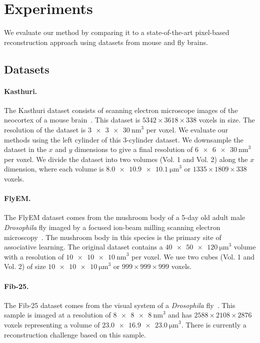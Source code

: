 \section{Experiments}

We evaluate our method by comparing it to a state-of-the-art pixel-based reconstruction approach using datasets from mouse and fly brains.

\subsection{Datasets}
\label{sec:dataset}

\paragraph{Kasthuri.}
The Kasthuri dataset consists of scanning electron microscope images of the neocortex of a mouse brain~\cite{kasthuri2015saturated}. 
This dataset is $5342 \times 3618 \times 338$ voxels in size. 
The resolution of the dataset is $\SI[product-units=single]{3 x 3 x 30}{\nano\meter}^3$ per voxel. 
We evaluate our methods using the left cylinder of this 3-cylinder dataset. 
We downsample the dataset in the $x$ and $y$ dimensions to give a final resolution of $\SI[product-units=single]{6 x 6 x 30}{\nano\meter}^3$ per voxel. 
We divide the dataset into two volumes (Vol. 1 and Vol. 2) along the $x$ dimension, where each volume is $\SI[product-units=single]{8.0 x 10.9 x 10.1}{\micro\meter}^3$ or $1335 \times 1809 \times 338$ voxels.

\paragraph{FlyEM.}
The FlyEM dataset comes from the mushroom body of a 5-day old adult male \textit{Drosophila} fly imaged by a focused ion-beam milling scanning electron microscopy~\cite{takemura2017connectome}.
The mushroom body in this species is the primary site of associative learning. 
The original dataset contains a $\SI[product-units=single]{40 x 50 x 120}{\micro\meter}^3$ volume with a resolution of $\SI[product-units=single]{10 x 10 x 10}{\nano\meter}^3$ per voxel. 
We use two cubes (Vol. 1 and Vol. 2) of size $\SI[product-units=single]{10 x 10 x 10}{\micro\meter}^3$ or $999 \times 999 \times 999$ voxels.

\paragraph{Fib-25.}
The Fib-25 dataset comes from the visual system of a \textit{Drosophila} fly~\cite{takemura2015synaptic}. This sample is imaged at a resolution of $\SI[product-units=single]{8 x 8 x 8}{\nano\meter}^3$ and has $2588 \times 2108 \times 2876$ voxels representing a volume of $\SI[product-units=single]{23.0 x 16.9 x 23.0}{\micro\meter}^3$. 
There is currently a reconstruction challenge based on this sample.

